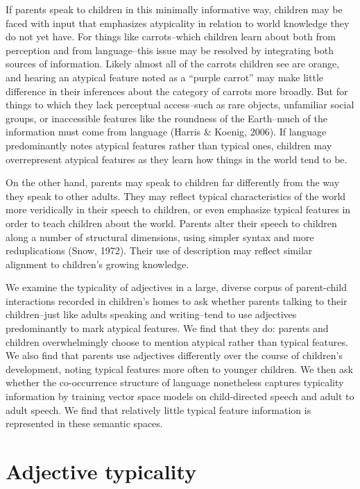 \documentclass[10pt, letterpaper]{article}
\begin{document}
If parents speak to children in this minimally informative way, children
may be faced with input that emphasizes atypicality in relation to world
knowledge they do not yet have. For things like carrots--which children
learn about both from perception and from language--this issue may be
resolved by integrating both sources of information. Likely almost all
of the carrots children see are orange, and hearing an atypical feature
noted as a ``purple carrot'' may make little difference in their
inferences about the category of carrots more broadly. But for things to
which they lack perceptual access--such as rare objects, unfamiliar
social groups, or inaccessible features like the roundness of the
Earth--much of the information must come from language (Harris \&
Koenig, 2006). If language predominantly notes atypical features rather
than typical ones, children may overrepresent atypical features as they
learn how things in the world tend to be.

On the other hand, parents may speak to children far differently from
the way they speak to other adults. They may reflect typical
characteristics of the world more veridically in their speech to
children, or even emphasize typical features in order to teach children
about the world. Parents alter their speech to children along a number
of structural dimensions, using simpler syntax and more reduplications
(Snow, 1972). Their use of description may reflect similar alignment to
children's growing knowledge.

We examine the typicality of adjectives in a large, diverse corpus of
parent-child interactions recorded in children's homes to ask whether
parents talking to their children--just like adults speaking and
writing--tend to use adjectives predominantly to mark atypical features.
We find that they do: parents and children overwhelmingly choose to
mention atypical rather than typical features. We also find that parents
use adjectives differently over the course of children's development,
noting typical features more often to younger children. We then ask
whether the co-occurrence structure of language nonetheless captures
typicality information by training vector space models on child-directed
speech and adult to adult speech. We find that relatively little typical
feature information is represented in these semantic spaces.

\hypertarget{adjective-typicality}{%
\section{Adjective typicality}\label{adjective-typicality}}
\end{document}
